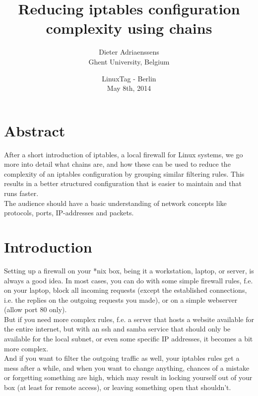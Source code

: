 \documentclass[a4paper,12pt]{article}
\begin{document}
\title{Reducing iptables configuration complexity using chains}
\author{Dieter Adriaenssens\\
Ghent University, Belgium}
\date{LinuxTag - Berlin\\
May 8th, 2014}
\maketitle

\pagebreak
\section{Abstract}

After a short introduction of iptables, a local firewall for Linux systems, we go more into detail what chains are, and how these can be used to reduce the complexity of an iptables configuration by grouping similar filtering rules. This results in a better structured configuration that is easier to maintain and that runs faster.\\

The audience should have a basic understanding of network concepts like protocols, ports, IP-addresses and packets.

\pagebreak
\tableofcontents

\section{Introduction}
Setting up a firewall on your *nix box, being it a workstation, laptop, or server, is always a good idea. In most cases, you can do with some simple firewall rules, f.e. on your laptop, block all incoming requests (except the established connections, i.e. the replies on the outgoing requests you made), or on a simple webserver (allow port 80 only).\\

But if you need more complex rules, f.e. a server that hosts a website available for the entire internet, but with an ssh and samba service that should only be available for the local subnet, or even some specific IP addresses, it becomes a bit more complex.\\
And if you want to filter the outgoing traffic as well, your iptables rules get a mess after a while, and when you want to change anything, chances of a mistake or forgetting something are high, which may result in locking yourself out of your box (at least for remote access), or leaving something open that shouldn't.\\
\end{document}
